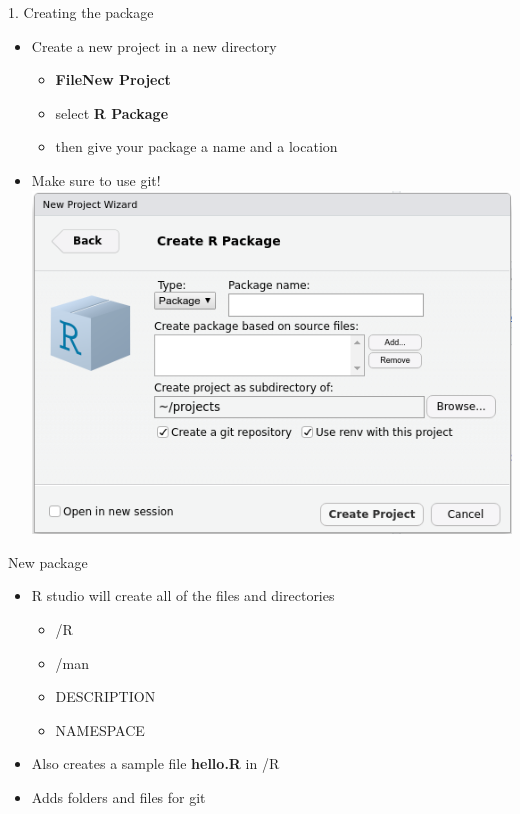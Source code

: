 \documentclass[
  ignorenonframetext,
  aspectratio=169]{beamer}
\providecommand{\tightlist}{%
  \setlength{\itemsep}{0pt}\setlength{\parskip}{0pt}}
\begin{document}
\begin{frame}{1. Creating the package}
\protect\hypertarget{creating-the-package}{}
\begin{itemize}
\tightlist
\item
  Create a new project in a new directory

  \begin{itemize}
  \tightlist
  \item
    \textbf{File\textbar New Project}
  \item
    select \textbf{R Package}
  \item
    then give your package a name and a location
  \end{itemize}
\item
  Make sure to use git! \includegraphics{figures/package.png}
\end{itemize}
\end{frame}

\begin{frame}{New package}
\protect\hypertarget{new-package}{}
\begin{itemize}
\tightlist
\item
  R studio will create all of the files and directories

  \begin{itemize}
  \tightlist
  \item
    /R
  \item
    /man
  \item
    DESCRIPTION
  \item
    NAMESPACE
  \end{itemize}
\item
  Also creates a sample file \textbf{hello.R} in /R
\item
  Adds folders and files for git
\end{itemize}
\end{frame}
\end{document}
